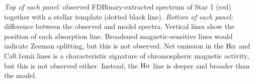 \label{fig:emission1} \emph{Top of each panel:} observed FDBinary-extracted spectrum of Star 1 (red) together with a stellar template (dotted black line). \emph{Bottom of each panel:} difference between the observed and model spectra. Vertical lines show the position of each absorption line. Broadened magnetic-sensitive lines would indicate Zeeman splitting, but this is not observed. Net emission in the $\rm{H}\alpha$ and {\rm Ca}\kern 0.1em{\sc ii} lines is a characteristic signature of chromospheric magnetic activity, but this is not observed either. Instead, the $\rm{H}\alpha$ line is deeper and broader than the model.
